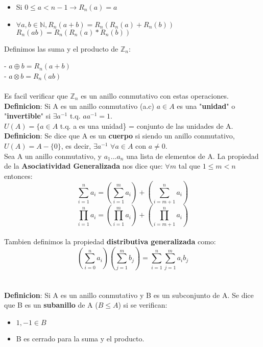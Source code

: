 \documentclass[11pt]{article}
\begin{document}
\begin{itemize}
\item Si $0 \leq a < n-1  \rightarrow R_n(a) = a$
\item $\forall a,b \in \mathbb{N}, R_n(a+b) = R_n(R_n(a) + R_n(b))$\\$R_n(ab) = R_n(R_n(a)*R_n(b))$

\end{itemize} 

Definimos las suma y el producto de $\mathbb{Z}_n$:

- $a\oplus b = R_n(a+b)$\\
\hspace*{0.6cm}- $a\otimes b = R_n(ab)$\\\\

Es facil verificar que $\mathbb{Z}_n$ es un anillo conmutativo con estas operaciones.\\

\textbf{Definicion}:
Si A es un anillo conmutativo (a.c) $a \in A$ es una "\textbf{unidad}" o "\textbf{invertible}" si $\exists a^{-1}$ t.q. $ aa^{-1} = 1$.\\ $U(A) = \{ a \in A$ t.q. a es una unidad\} = conjunto de las unidades de A.\\

\textbf{Definicion}: Se dice que A es un \textbf{cuerpo} si siendo un anillo conmutativo, $U(A) = A - \{0\}$, es decir, $\exists a^{-1}$ $\forall a \in A$ con $a \neq 0$.\\

Sea A un anillo conmutativo, y $a_1 ... a_n$ una lista de elementos de A.
La propiedad de la \textbf{Asociatividad Generalizada} nos dice que:
$\forall m$ tal que $1 \leq m < n$ entonces: \[\sum_{i=1}^{n}a_i = (\sum_{i=1}^{m}a_i) + (\sum_{i=m+1}^{n}a_i)\]\[\prod_{i=1}^{n}a_i = (\prod_{i=1}^{m}a_i) + (\prod_{i=m+1}^{n}a_i)\]\\

Tambien definimos la propiedad \textbf{distributiva generalizada} como:\\

\[(\sum_{i=0}^{n} a_i)(\sum_{j=1}^{m}b_j) = \sum_{i=1}^{n}\sum_{j=1}^{m}a_i b_j\]\\\\

\textbf{Definicion}:
Si A es un anillo conmutativo y B es un subconjunto de A. Se dice que B es un \textbf{subanillo} de A ($B \leq A$) si se verifican:
\begin{itemize}
\item $1,-1 \in B$
\item B es cerrado para la suma y el producto.
\end{itemize}
\end{document}
